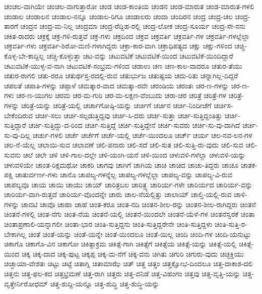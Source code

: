 {ಚಂಚಲ-ವಾಗಿಯೇ
ಚಂಚಲ-ವಾಗುತ್ತಾರೋ
ಚಂಡ
ಚಂಡ-ಕಾಂತಿಯ
ಚಂಡನ
ಚಂಡ-ಮಾರುತ
ಚಂಡ-ಮಾರುತ-ಗಳಲಿ
ಚಂಡಾಲ
ಚಂಡಾಲನ
ಚಂಡಾಲ-ನನ್ನೂ
ಚಂಡಾಲ-ರಿಗೂ
ಚಂಡಾಲರು
ಚಂದಾ
ಚಂದಿರನ
ಚಂದ್ರ
ಚಂದ್ರ-ಚಲ
ಚಂದ್ರ-ತಾರಗೆ
ಚಂದ್ರನ
ಚಂದ್ರ-ಮ-ನಿಲ್ಲ
ಚಂದ್ರಮಾ
ಚಂದ್ರ-ರೆದ್ದಿಹ-ರಲ್ಲಿ
ಚಂದ್ರ-ಲೋಕ
ಚಂದ್ರ-ಸೂರ್ಯ
ಚಂದ್ರ-ಸೇ-ನನು
ಚಕಿತ-ರಾದರು
ಚಕ್ರಕ್ಕೆ
ಚಕ್ರ-ಗಳಿ-ರುತ್ತವೆ
ಚಕ್ರ-ಗಳು
ಚಕ್ರದಿಂದ
ಚಕ್ರವ
ಚಕ್ರವರ್ತಿ
ಚಕ್ರವರ್ತಿ-ಗಳ
ಚಕ್ರವರ್ತಿ-ಗಳಲ್ಲೆಲ್ಲಾ
ಚಕ್ರವರ್ತಿ-ಗಳು
ಚಕ್ರವರ್ತಿ-ಶಿರೋ-ಮಣಿ-ಗಳಾಗಿದ್ದರು
ಚಕ್ರಾ-ಕಾರ-ವಾಗಿ
ಚಕ್ರಾಧಿಪತ್ಯದ
ಚಕ್ಷು
ಚಕ್ಷು-ಗಳಿಂದ
ಚಚ್ಚಿ-ಕೊಳ್ಳ-ಬೇ-ಕಾದ್ದಿಲ್ಲ
ಚಚ್ಚಿ-ಕೊಳ್ಳುತ್ತಾ
ಚಟ-ವನ್ನು
ಚಟುವಟಿಕೆ
ಚಟುವಟಿಕೆ-ಯಿಂದ
ಚಟುವಟಿಕೆ-ಯಿಂದಿದ್ದಾರೆ
ಚಟುವಟಿಕೆ-ಯುಳ್ಳ-ವ-ನಾಗಿ
ಚಟುವಟಿಕೆ-ಸಂಭ್ರಮ-ಗಳಿಂದ
ಚಡಾಉ
ಚಣ
ಚಣ-ಕಾಲ-ವಾದರೂ
ಚತುರ-ತೆಯು
ಚತುರ-ರಾಗಲಿ
ಚತು-ರರೂ
ಚತುರ್ಥಸ್ತ-ರದಲ್ಲಿ-ರುವ
ಚತುರ್ಭುಜ
ಚತುಷ್ಟಯ
ಚದು-ರಿತು
ಚನ್ನಾಗಿಲ್ಲ-ದಿದ್ದರೆ
ಚಪಲತೆ
ಚಪಾತಿ-ಗಳನ್ನು
ಚಪ್ಪಾಳೆ
ಚಮತ್ಕಾರ-ವಾದ
ಚಮತ್ಕಾ-ರವೇ
ಚರಂಡಿಯ
ಚರಂತಃ
ಚರ-ಣ-ಗಳನ್ನು
ಚರ-ಣ-ಗಳು
ಚರ-ಣ-ಯುಗಲ
ಚರಮ
ಚರ-ಮ-ಗುರಿ
ಚರ-ಮ-ಲಕ್ಷಣ-ವೆಂಬುದು
ಚರಾ-ಚರ
ಚರಿತ್ರೆ
ಚರಿತ್ರೆ-ಗಳ
ಚರಿತ್ರೆ-ಗಳನ್ನು
ಚರಿತ್ರೆ-ಯನ್ನು
ಚರಿತ್ರೆ-ಯಲ್ಲಿ
ಚರ್ಚಾಗೋಷ್ಠಿ-ಯನ್ನು
ಚರ್ಚಿಗೆ
ಚರ್ಚಿನ
ಚರ್ಚಿ-ನಿಂದೀಚೆಗೆ
ಚರ್ಚಿಸ-ಬೇಕೆಂದಿರುವ
ಚರ್ಚಿ-ಸಲು
ಚರ್ಚಿ-ಸಲ್ಪಡುತ್ತಿದ್ದವು
ಚರ್ಚಿ-ಸಿ-ದರು
ಚರ್ಚಿ-ಸುತ್ತಾ
ಚರ್ಚಿ-ಸುತ್ತಿದ್ದಂತಿತ್ತು
ಚರ್ಚಿ-ಸುತ್ತಿದ್ದಾರೆ
ಚರ್ಚಿ-ಸುತ್ತಿದ್ದು-ದ-ರಿಂದ
ಚರ್ಚಿ-ಸುತ್ತಿದ್ದೆ
ಚರ್ಚಿ-ಸುತ್ತಿದ್ದೇನೆ
ಚರ್ಚಿ-ಸುವರು
ಚರ್ಚಿ-ಸು-ವು-ದಾಗಿದೆ
ಚರ್ಚಿ-ಸು-ವು-ದಿಲ್ಲ
ಚರ್ಚು-ಗಳಲಿ
ಚರ್ಚೆ
ಚರ್ಚೆಗೆ
ಚರ್ಚೆ-ಯಲ್ಲಿ
ಚರ್ಚೆ-ಯಿಂದಲೂ
ಚರ್ಚ್
ಚರ್ಯ
ಚಲ-ನವ-ಲನ-ಗಳ
ಚಲ-ನೆ-ಯೆಲ್ಲ
ಚಲಾಯಿ-ಸುವ
ಚಲಾವಣೆ
ಚಲಿ-ಪನಾರು
ಚಲಿ-ಸದೆ
ಚಲಿ-ಸುತ
ಚಲಿ-ಸುತ್ತಿ-ರು-ವುದು
ಚಲಿ-ಸುವ
ಚಲಿ-ಸುವನು
ಚಲೆ
ಚಲೇ
ಚಳಿ
ಚಳಿ-ಗಾಲ-ದಲ್ಲೇ
ಚಳಿ-ಯಂಗಿ-ಯನೆ
ಚಳಿ-ಯಿಂದ
ಚಳುವಳಿ-ಗಳೆಲ್ಲಾ
ಚಳುವಳಿ-ಯನ್ನು
ಚಳುವಳಿಯೇ
ಚಾಂತ-ರಿಕ್ಷಮಥೋ
ಚಾಕರಿ
ಚಾಗವು
ಚಾಗಿಗೆ
ಚಾಗಿಯ
ಚಾಚಿ
ಚಾಚಿದ
ಚಾಚು-ತಿದ್ದರು
ಚಾಚೂ
ಚಾತಕ-ಪಕ್ಷಿ
ಚಾತುರ್ವರ್ಣ-ಗಳು
ಚಾನೊ
ಚಾಪಲ್ಯ-ಗಳನ್ನೆಲ್ಲ
ಚಾಪಲ್ಯ-ಗಳಲ್ಲೆಲ್ಲಾ
ಚಾಪಲ್ಯ-ವನ್ನು
ಚಾಪಲ್ಯ-ವಿ-ರುವ
ಚಾಪಲ್ಯವೂ
ಚಾಯ
ಚಾಯಿ
ಚಾಯು
ಚಾಯ್
ಚಾರಿತ್ರಬಲ
ಚಾರಿತ್ರ್ಯ
ಚಾರಿರ್ಯ-ಗಳೇ
ಚಾರಿರ್ಯದ
ಚಾರಿರ್ಯ-ವನ್ನು
ಚಾರಿರ್ಯ-ವಾಗಿ-ರುತ್ತದೆ
ಚಾರಿರ್ಯ-ವೊಂದನ್ನೇ
ಚಾರು
ಚಾಲ-ನೆಯಲ್ಲಿತ್ತು
ಚಾಲಾಯ್
ಚಾಲ್ತಿ-ಯಲ್ಲಿ-ರುವ
ಚಾಳಿ-ಗಳನ್ನು
ಚಾವಟಿ
ಚಾವೊ
ಚಾಹಾ
ಚಾಹೆ
ಚಿಂತ-ಕರೂ
ಚಿಂತ-ನದಿ
ಚಿಂತನ-ಶೀಲ-ರನ್ನು
ಚಿಂತನ-ಶೀಲ-ರಾಗಿದ್ದರು
ಚಿಂತನೆ
ಚಿಂತನೆ-ಗಳಲ್ಲಿ
ಚಿಂತ-ನೆಗು
ಚಿಂತ-ನೆಯ
ಚಿಂತನೆ-ಯಲ್ಲಿ
ಚಿಂತನೆ-ಯಿಂದಲೇ
ಚಿಂತನೆ-ಯೆಳೆ-ಗಳ
ಚಿಂತನೆಸ್ವರಕೆ
ಚಿಂತಾ
ಚಿಂತಾಪ್ರಣಾಲಿ-ಯನ್ನಾಗಲೀ
ಚಿಂತಾ-ಭಾರ
ಚಿಂತಿ-ಸುತ್ತಿದ್ದನು
ಚಿಂತಿ-ಸುತ್ತಿದ್ದರೇನೇ
ಚಿಂತಿ-ಸುತ್ತಿದ್ದಳು
ಚಿಂತಿ-ಸುತ್ತಿ-ರ-ಬೇಕಾಗಿಲ್ಲ
ಚಿಂತೆ
ಚಿಂತೆ-ಯನ್ನು
ಚಿಂತೆ-ಯನ್ನೇ
ಚಿಂತೆ-ಯಿಂದಲೂ
ಚಿಂತೆ-ಯಿಲ್ಲ
ಚಿಂದಿ
ಚಿಂದಿ-ಗಳ
ಚಿಂದಿ-ಯನುಟ್ಟು
ಚಿಕಾಗೊ
ಚಿಕಾಗೊ-ವಿನ
ಚಿಕಾಗೋ
ಚಿಕಿತ್ಸಾಕ್ರಮ
ಚಿಕಿತ್ಸೆ-ಗಾಗಿ
ಚಿಕಿತ್ಸೆಗೆ
ಚಿಕಿತ್ಸೆಯ
ಚಿಕಿತ್ಸೆ-ಯನ್ನು
ಚಿಕಿತ್ಸೆ-ಯಲ್ಲಿ
ಚಿಕಿತ್ಸೆ-ಯಿಂದ
ಚಿಕ್ಕ
ಚಿಕ್ಕ-ದಾದ
ಚಿಕ್ಕ-ಪುಟ್ಟ
ಚಿಕ್ಕಪ್ಪ
ಚಿಕ್ಕ-ಮ-ನೆಗೆ
ಚಿಕ್ಕ-ವನು
ಚಿಗಿತು
ಚಿಗುರಿ
ಚಿಗುರು-ವುದು
ಚಿಚ್ಛಕ್ತಿಯು
ಚಿಚ್ಛಾಯಾ-ವೇಶತಃ
ಚಿಟ್ಟು
ಚಿಟ್ಟೆ
ಚಿತಾಗ್ನಿ
ಚಿತಾಮಾಝೆ
ಚಿತ್
ಚಿತ್ತ
ಚಿತ್ತಂ
ಚಿತ್ತಕ್ಷೋಭ-ದಿಂದಲೂ
ಚಿತ್ತ-ದಾಕಾಶ-ದಲಿ
ಚಿತ್ತನು
ಚಿತ್ತ-ಫಲ-ಕದ
ಚಿತ್ತಭ್ರಮಣೆ
ಚಿತ್ತ-ರಾಗಿ
ಚಿತ್ತರು
ಚಿತ್ತ-ವನಿಡೆ
ಚಿತ್ತ-ವಿಹಂಗಂ
ಚಿತ್ತವು
ಚಿತ್ತ-ವೃತ್ತಿ-ಯನ್ನು
ಚಿತ್ತ-ವೃತ್ತೇರ್ನಿರೋಧಮ್
ಚಿತ್ತ-ಶುದ್ದಿ-ಯನ್ನೂ
ಚಿತ್ತ-ಶುದ್ಧಿ
ಚಿತ್ತ-ಶುದ್ಧಿ-ಯನ್ನು
}
